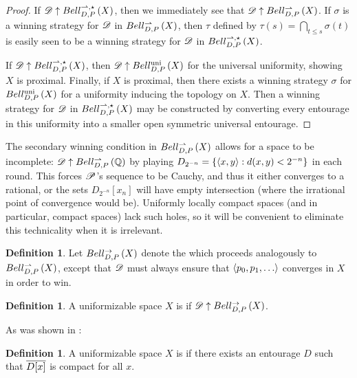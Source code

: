 \documentclass{amsart}
\theoremstyle{definition}
\newtheorem{definition}[theorem]{Definition}
\begin{document}
  \begin{proof}
    If \(\mathscr{D}\uparrow Bell_{D,P}^{\rightharpoonup,\star}\left({X}\right)\), then we immediately see that
    \(\mathscr{D}\uparrow Bell_{D,P}^{\rightharpoonup}\left({X}\right)\).
    If \(\sigma\) is a winning strategy for \(\mathscr{D}\)
    in \(Bell_{D,P}^{\rightharpoonup}\left({X}\right)\), then \(\tau\) defined by
    \(\tau(s)=\bigcap_{t\leq s}\sigma(t)\) is easily seen to be a winning
    strategy for \(\mathscr{D}\) in \(Bell_{D,P}^{\rightharpoonup,\star}\left({X}\right)\).

    If \(\mathscr{D}\uparrow Bell_{D,P}^{\rightharpoonup,\star}\left({X}\right)\), then \(\mathscr{D}\uparrow Bell_{D,P}^{\textrm{uni}}\left({X}\right)\)
    for the universal uniformity, showing \(X\) is proximal.
    Finally, if \(X\) is proximal, then there exists a winning strategy
    \(\sigma\) for \(Bell_{D,P}^{\textrm{uni}}\left({X}\right)\) for a uniformity inducing the
    topology on \(X\). Then a winning strategy for \(\mathscr{D}\) in
    \(Bell_{D,P}^{\rightharpoonup,\star}\left({X}\right)\) may be constructed by converting every
    entourage in this uniformity into a smaller open symmetric universal
    entourage.
  \end{proof}

  The secondary winning condition in \(Bell_{D,P}^{\rightharpoonup}\left({X}\right)\)
  allows for a space to be incomplete: \(\mathscr{D}\uparrow Bell_{D,P}^{\rightharpoonup}\left({\mathbb{Q}}\right)\) by
  playing \(D_{2^{-n}}=\{\langle x,y\rangle:d(x,y)<2^{-n}\}\) in each round. This
  forces \(\mathscr{P}\)'s sequence to be Cauchy, and thus it either converges to
  a rational, or the sets \(D_{2^{-n}}[x_n]\) will have empty intersection
  (where the irrational point of convergence would be). Uniformly locally
  compact spaces (and in particular, compact spaces) lack such holes, so it
  will be convenient to eliminate this technicality when it is irrelevant.

  \begin{definition}
    Let \(Bell_{D,P}^{\to}\left({X}\right)\) denote the
     which
    proceeds analogously to \(Bell_{D,P}^{\rightharpoonup}\left({X}\right)\), except
    that \(\mathscr{D}\) must always ensure that \(\<p_0,p_1,\dots\>\) converges
    in \(X\) in order to win.
  \end{definition}

  \begin{definition}
    A uniformizable space \(X\) is  if
    \(\mathscr{D} \uparrow Bell_{D,P}^{\to}\left({X}\right)\).
  \end{definition}

  As was shown in \cite{MR3227201}:

  \begin{definition}
    A uniformizable space \(X\) is  if there
    exists an entourage \(D\) such that \(\overline{D[x]}\) is compact
    for all \(x\).
  \end{definition}
\end{document}
